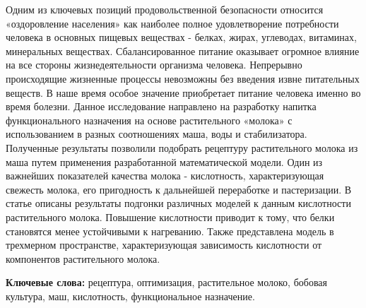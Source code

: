 Одним из ключевых позиций продовольственной безопасности относится
«оздоровление населения» как наиболее полное удовлетворение потребности
человека в основных пищевых веществах - белках, жирах, углеводах,
витаминах, минеральных веществах. Сбалансированное питание оказывает
огромное влияние на все стороны жизнедеятельности организма человека.
Непрерывно происходящие жизненные процессы невозможны без введения извне
питательных веществ. В наше время особое значение приобретает питание
человека именно во время болезни. Данное исследование направлено на
разработку напитка функционального назначения на основе растительного
«молока» с использованием в разных соотношениях маша, воды и
стабилизатора. Полученные результаты позволили подобрать рецептуру
растительного молока из маша путем применения разработанной
математической модели. Один из важнейших показателей качества молока -
кислотность, характеризующая свежесть молока, его пригодность к
дальнейшей переработке и пастеризации. В статье описаны результаты
подгонки различных моделей к данным кислотности растительного молока.
Повышение кислотности приводит к тому, что белки становятся менее
устойчивыми к нагреванию. Также представлена модель в трехмерном
пространстве, характеризующая зависимость кислотности от компонентов
растительного молока.

{\bfseries Ключевые слова:} рецептура, оптимизация, растительное молоко,
бобовая культура, маш, кислотность, функциональное назначение.

